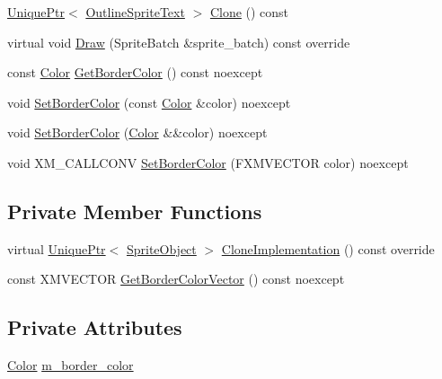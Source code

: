 \begin{DoxyCompactItemize}
\item 
\hyperlink{namespacemage_a3316d7143a973e37adf1110f2e80ca31}{Unique\+Ptr}$<$ \hyperlink{classmage_1_1_outline_sprite_text}{Outline\+Sprite\+Text} $>$ \hyperlink{classmage_1_1_outline_sprite_text_aa188cb104f6f00fdc75c532d66869f02}{Clone} () const
\item 
virtual void \hyperlink{classmage_1_1_outline_sprite_text_a524e9ad1caeeeaa32405e61d1a5e1032}{Draw} (Sprite\+Batch \&sprite\+\_\+batch) const override
\item 
const \hyperlink{structmage_1_1_color}{Color} \hyperlink{classmage_1_1_outline_sprite_text_adb4936119bcc0b148c9e11f021e83940}{Get\+Border\+Color} () const noexcept
\item 
void \hyperlink{classmage_1_1_outline_sprite_text_a66b448443de5a459bb28f66c682a12bd}{Set\+Border\+Color} (const \hyperlink{structmage_1_1_color}{Color} \&color) noexcept
\item 
void \hyperlink{classmage_1_1_outline_sprite_text_a7bd6e4fc0afefb65ca9d543f52941400}{Set\+Border\+Color} (\hyperlink{structmage_1_1_color}{Color} \&\&color) noexcept
\item 
void X\+M\+\_\+\+C\+A\+L\+L\+C\+O\+NV \hyperlink{classmage_1_1_outline_sprite_text_a861b01bf303caf0c08a599f3d4a77894}{Set\+Border\+Color} (F\+X\+M\+V\+E\+C\+T\+OR color) noexcept
\end{DoxyCompactItemize}
\subsection*{Private Member Functions}
\begin{DoxyCompactItemize}
\item 
virtual \hyperlink{namespacemage_a3316d7143a973e37adf1110f2e80ca31}{Unique\+Ptr}$<$ \hyperlink{classmage_1_1_sprite_object}{Sprite\+Object} $>$ \hyperlink{classmage_1_1_outline_sprite_text_af8d29408abb61c05a23499bf37c4c7b0}{Clone\+Implementation} () const override
\item 
const X\+M\+V\+E\+C\+T\+OR \hyperlink{classmage_1_1_outline_sprite_text_a287bef30662bbd00ca999b3577249226}{Get\+Border\+Color\+Vector} () const noexcept
\end{DoxyCompactItemize}
\subsection*{Private Attributes}
\begin{DoxyCompactItemize}
\item 
\hyperlink{structmage_1_1_color}{Color} \hyperlink{classmage_1_1_outline_sprite_text_a19301d370498a08759445f415da78822}{m\+\_\+border\+\_\+color}
\end{DoxyCompactItemize}
